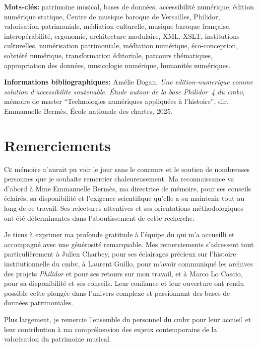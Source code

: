\documentclass[12pt,twoside]{book}
\begin{document}
	\newpage
	
	\textbf{Mots-clés:} patrimoine musical, bases de données, accessibilité numérique, édition numérique statique, Centre de musique baroque de Versailles, Philidor, valorisation patrimoniale, médiation culturelle, musique baroque française, interopérabilité, ergonomie, architecture modulaire, XML, XSLT, institutions culturelles, numérisation patrimoniale, médiation numérique, éco-conception, sobriété numérique, transformation éditoriale, parcours thématiques, appropriation des données, musicologie numérique, humanités numériques.
	
	\textbf{Informations bibliographiques:} Amélie Dogan, \textit{Une \gls{edition-numerique} comme solution d'\gls{accessibilite} soutenable. Étude autour de la base \textit{Philidor~4} du \gls{cmbv}}, mémoire de master \enquote{Technologies numériques appliquées à l'histoire}, dir. Emmanuelle Bermès, École nationale des chartes, 2025.
	
	\newpage{\pagestyle{empty}\cleardoublepage}
	
	\chapter{Remerciements}
	
	\lettrine{C}e mémoire n'aurait pu voir le jour sans le concours et le soutien de nombreuses personnes que je souhaite remercier chaleureusement. Ma reconnaissance va d'abord à Mme Emmanuelle Bermès, ma directrice de mémoire, pour ses conseils éclairés, sa disponibilité et l'exigence scientifique qu'elle a su maintenir tout au long de ce travail. Ses relectures attentives et ses orientations méthodologiques ont été déterminantes dans l'aboutissement de cette recherche.
	
	Je tiens à exprimer ma profonde gratitude à l'équipe du  qui m'a accueilli et accompagné avec une générosité remarquable. Mes remerciements s'adressent tout particulièrement à Julien Charbey, pour ses éclairages précieux sur l'histoire institutionnelle du \gls{cmbv}, à Laurent Guillo, pour m'avoir communiqué les archives des projets \textit{Philidor} et pour ses retours sur mon travail, et à Marco Lo Cascio, pour sa disponibilité et ses conseils. Leur confiance et leur ouverture ont rendu possible cette plongée dans l'univers complexe et passionnant des bases de données patrimoniales.
	
	Plus largement, je remercie l'ensemble du personnel du \gls{cmbv} pour leur accueil et leur contribution à ma compréhension des enjeux contemporains de la valorisation du patrimoine musical.
	
\end{document}
